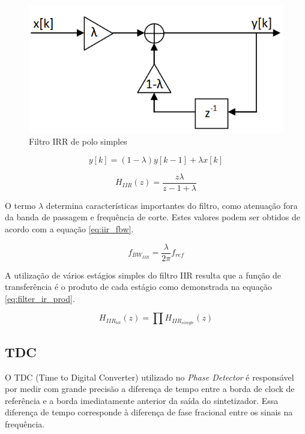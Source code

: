 \begin{figure}[h!]
	\caption{Filtro IRR de polo simples}
	\begin{center}
		\includegraphics[scale=0.8]{img/filter_IRR_time_domain.png}
	\end{center}
	\label{fig:filter_IRR_time_domain}
\end{figure}


 \begin{equation}
	y[k]= (1 - \lambda) y[k-1] + \lambda x[k]
	\label{eq:irr_simple_pole}
\end{equation}

 \begin{equation}
	H_{IIR}(z)= \frac{z \lambda}{z -1 + \lambda}
	\label{eq:irr_tranfer_function}
\end{equation}


O termo $\lambda$ determina características importantes do filtro, como atenuação fora da banda de passagem e frequência de corte. Estes valores podem ser obtidos de acordo com a equação \ref{eq:iir_fbw}.


 \begin{equation}
	f_{BW_{IIR}}= \frac{\lambda}{2 \pi} f_{ref}
	\label{eq:iir_fbw}
\end{equation}

A utilização de vários estágios simples do filtro IIR resulta que a função de transferência é o produto de cada estágio como demonstrada na equação \ref{eq:filter_ir_prod}.

 \begin{equation}
	H_{IIR_{tot}}(z)= \prod 	H_{IIR_{simgle}}(z)
	\label{eq:filter_ir_prod}
\end{equation}

\subsection{TDC}
O TDC (Time to Digital Converter) utilizado no \textit{Phase Detector} é responsável por medir com grande precisão a diferença de tempo entre a borda de clock de referência e a borda imediatamente anterior da saída do sintetizador. Essa diferença de tempo corresponde à diferença de fase fracional entre os sinais na frequência.

